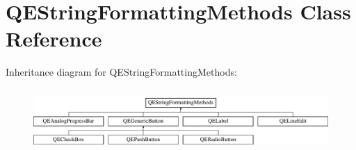 \hypertarget{classQEStringFormattingMethods}{
\section{QEStringFormattingMethods Class Reference}
\label{classQEStringFormattingMethods}
}
Inheritance diagram for QEStringFormattingMethods:\begin{figure}[H]
\begin{center}
\leavevmode
\includegraphics[height=2.359551cm]{classQEStringFormattingMethods}
\end{center}
\end{figure}
